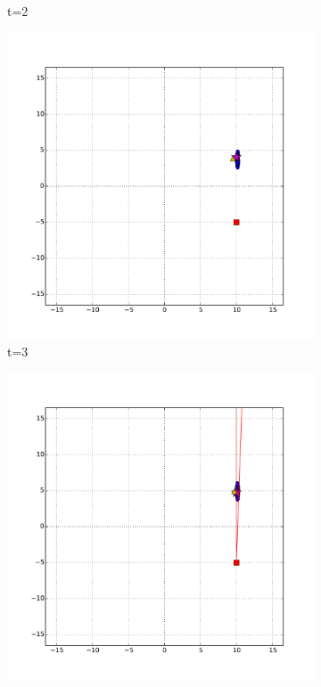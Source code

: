 \begin{figure}
\begin{subfigure}[b]{0.3\textwidth}
	            \caption{t=2}
	            \label{fig:high_vel_noise_t_2}
	    \end{subfigure}
	    \begin{subfigure}[b]{0.3\textwidth}
	            \includegraphics[width=\textwidth]{high_vel_noise_t_3}
	            \caption{t=3}
	            \label{fig:high_vel_noise_t_3}
	    \end{subfigure}
	    \begin{subfigure}[b]{0.3\textwidth}
	            \includegraphics[width=\textwidth]{high_vel_noise_t_4}

\end{subfigure}
\end{figure}
